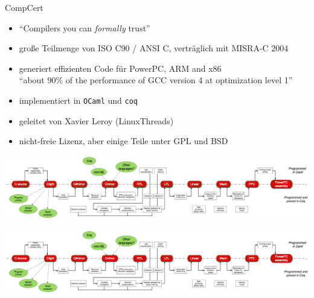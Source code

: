 \documentclass[aspectratio=169]{beamer}
\begin{document}
\begin{frame}
  \begin{center}
    \Large{CompCert}
  \end{center}
  \begin{itemize}
  \item ``Compilers you can \textit{formally} trust''
  \item große Teilmenge von ISO C90 / ANSI C, verträglich mit MISRA-C 2004
  \item generiert effizienten Code für PowerPC, ARM and x86\\
    ``about 90\% of the performance of GCC version 4 at optimization level 1''
  \item implementiert in \texttt{OCaml} und \texttt{coq}
  \item geleitet von Xavier Leroy (LinuxThreads) 
  \item nicht-freie Lizenz, aber einige Teile unter GPL und BSD
  \end{itemize}
\end{frame}
\begin{frame}
  \begin{center}
    \includegraphics[trim=0 0 1000 0,clip,width=\textwidth]{compcert_diagram.png}
  \end{center}
\end{frame}
\begin{frame}
  \begin{center}
    \includegraphics[trim=1200 0 0 0,clip,width=\textwidth]{compcert_diagram.png}
  \end{center}
\end{frame}
\end{document}
